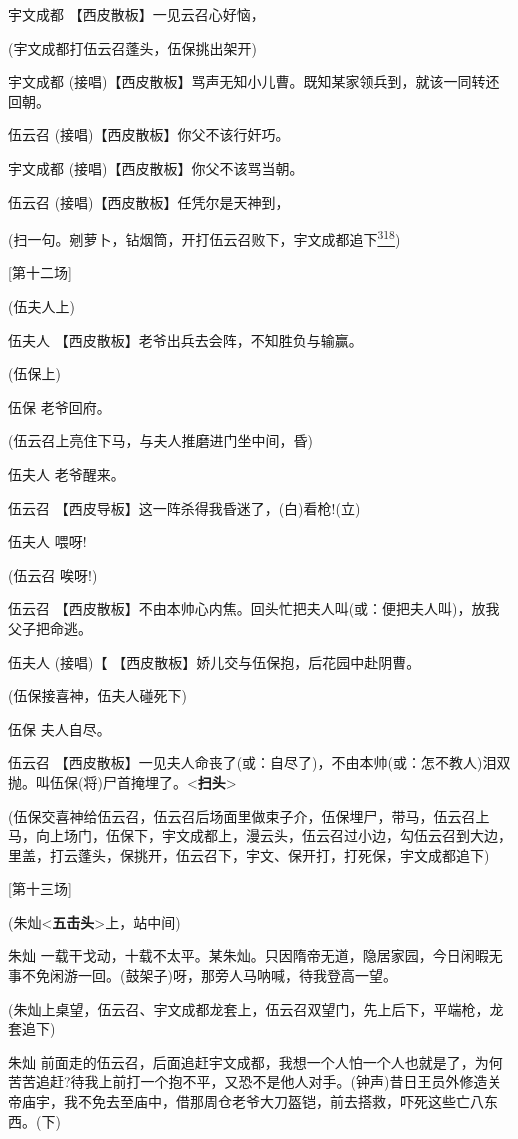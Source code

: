 宇文成都 【西皮散板】一见云召心好恼，

(宇文成都打伍云召蓬头，伍保挑出架开)

宇文成都
(接唱)【西皮散板】骂声无知小儿曹。既知某家领兵到，就该一同转还回朝。

伍云召 (接唱)【西皮散板】你父不该行奸巧。

宇文成都 (接唱)【西皮散板】你父不该骂当朝。

伍云召 (接唱)【西皮散板】任凭尔是天神到，

(扫一句。剜萝卜，钻烟筒，开打伍云召败下，宇文成都追下\protect\hyperlink{fn318}{\textsuperscript{318}})

{[}第十二场{]}

(伍夫人上)

伍夫人 【西皮散板】老爷出兵去会阵，不知胜负与输赢。

(伍保上)

伍保 老爷回府。

(伍云召上亮住下马，与夫人推磨进门坐中间，昏)

伍夫人 老爷醒来。

伍云召 【西皮导板】这一阵杀得我昏迷了，(白)看枪!(立)

伍夫人 喂呀!

(伍云召 唉呀!)

伍云召
【西皮散板】不由本帅心内焦。回头忙把夫人叫(或：便把夫人叫)，放我父子把命逃。

伍夫人 (接唱)【 【西皮散板】娇儿交与伍保抱，后花园中赴阴曹。

(伍保接喜神，伍夫人碰死下)

伍保 夫人自尽。

伍云召
【西皮散板】一见夫人命丧了(或：自尽了)，不由本帅(或：怎不教人)泪双抛。叫伍保(将)尸首掩埋了。\textless{}\textbf{扫头}\textgreater{}

(伍保交喜神给伍云召，伍云召后场面里做束子介，伍保埋尸，带马，伍云召上马，向上场门，伍保下，宇文成都上，漫云头，伍云召过小边，勾伍云召到大边，里盖，打云蓬头，保挑开，伍云召下，宇文、保开打，打死保，宇文成都追下)

{[}第十三场{]}

(朱灿\textless{}\textbf{五击头}\textgreater{}上，站中间)

朱灿
一载干戈动，十载不太平。某朱灿。只因隋帝无道，隐居家园，今日闲暇无事不免闲游一回。(鼓架子)呀，那旁人马呐喊，待我登高一望。

(朱灿上桌望，伍云召、宇文成都龙套上，伍云召双望门，先上后下，平端枪，龙套追下)

朱灿
前面走的伍云召，后面追赶宇文成都，我想一个人怕一个人也就是了，为何苦苦追赶?待我上前打一个抱不平，又恐不是他人对手。(钟声)昔日王员外修造关帝庙宇，我不免去至庙中，借那周仓老爷大刀盔铠，前去搭救，吓死这些亡八东西。(下)

